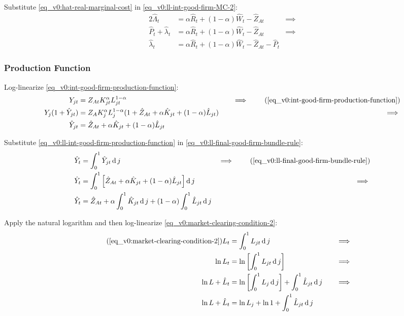 \documentclass[../thesis.tex]{subfiles}
\begin{document}
	Substitute \ref{eq_v0:hat-real-marginal-cost} in \ref{eq_v0:ll-int-good-firm-MC-2}:
	\begin{alignat}{2}
		\hat{\Lambda}_t &= \alpha \hat{R}_t + (1- \alpha) \hat{W}_t - \hat{Z}_{At} &\implies \nonumber \\
		\hat{P}_t + \hat{\lambda}_t &= \alpha \hat{R}_t + (1- \alpha) \hat{W}_t - \hat{Z}_{At} &\implies \nonumber \\
		\hat{\lambda}_t &= \alpha \hat{R}_t + (1- \alpha) \hat{W}_t - \hat{Z}_{At} - \hat{P}_t \label{eq_v0:ll-int-good-firm-MC-3}
	\end{alignat}
	
	
	\subsubsection*{Production Function}
	
	Log-linearize \ref{eq_v0:int-good-firm-production-function}:
	\begin{alignat}{2}
		Y_{jt} &= Z_{At} K_{jt}^\alpha L_{jt}^{1-\alpha} &\implies \tag{\ref{eq_v0:int-good-firm-production-function}} \\
		Y_{j} (1+ \hat{Y}_{jt}) &= Z_{A} K_{j}^\alpha L_{j}^{1-\alpha} (1+ \hat{Z}_{At} + \alpha \hat{K}_{jt} + (1-\alpha) \hat{L}_{jt}) \quad &\implies \nonumber \\
		\hat{Y}_{jt} &= \hat{Z}_{At} + \alpha \hat{K}_{jt} + (1-\alpha) \hat{L}_{jt} \label{eq_v0:ll-int-good-firm-production-function}
	\end{alignat}
	
	Substitute \ref{eq_v0:ll-int-good-firm-production-function} in \ref{eq_v0:ll-final-good-firm-bundle-rule}:
	\begin{alignat}{2}
		\hat{Y}_t &= \int_{0}^{1} \hat{Y}_{jt} \dif j &\implies \tag{\ref{eq_v0:ll-final-good-firm-bundle-rule}} \\
		\hat{Y}_t &= \int_{0}^{1} \left[ \hat{Z}_{At} + \alpha \hat{K}_{jt} + (1-\alpha) \hat{L}_{jt} \right] \dif j &\implies \nonumber \\
		\hat{Y}_t &= \hat{Z}_{At} + \alpha \int_{0}^{1} \hat{K}_{jt} \dif j + (1-\alpha) \int_{0}^{1} \hat{L}_{jt} \dif j \label{eq_v0:ll-final-good-firm-bundle-rule-2}
	\end{alignat}
	
	Apply the natural logarithm and then log-linearize \ref{eq_v0:market-clearing-condition-2}:
	\begin{alignat}{2}
		\tag{\ref{eq_v0:market-clearing-condition-2}}
		L_t &= \int_{0}^{1} L_{jt} \dif j &\implies \\
		\ln L_t &= \ln \left[ \int_{0}^{1} L_{jt} \dif j \right] &\implies \nonumber \\
		\ln L + \hat{L}_t &= \ln \left[ \int_{0}^{1} L_{j} \dif j \right] + \int_{0}^{1} \hat{L}_{jt} \dif j \quad &\implies \nonumber \\
		\ln L + \hat{L}_t &= \ln L_{j} + \ln 1 + \int_{0}^{1} \hat{L}_{jt} \dif j \nonumber
	\end{alignat}
	
\end{document}
